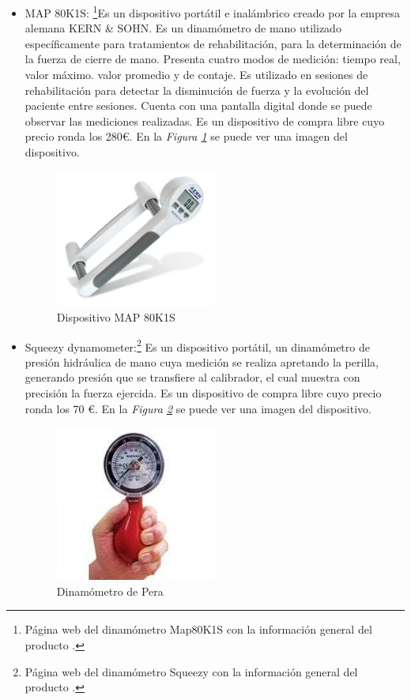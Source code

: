 \begin{itemize}
    \item MAP 80K1S: \cite{Map80k1s}\footnote{Página web del dinamómetro Map80K1S con la información general del producto \cite{Map80k1s}.}Es un dispositivo portátil e inalámbrico creado por la empresa alemana KERN \& SOHN. Es un dinamómetro de mano utilizado específicamente para tratamientos de rehabilitación, para la determinación de la fuerza de cierre de mano.
    Presenta cuatro modos de medición: tiempo real, valor máximo. valor promedio y de contaje. 
    Es utilizado en sesiones de rehabilitación para detectar la disminución de fuerza y la evolución del paciente entre sesiones. Cuenta con una pantalla digital donde se puede observar las mediciones realizadas.
    Es un dispositivo de compra libre cuyo precio ronda los 280€. En la \textit{Figura \ref{fig:Dispositivo MAP 80K1S}} se puede ver una imagen del dispositivo.
      \begin{figure}[h]
        \centering
        \includegraphics[width=0.5\textwidth]{img/MAP-80K1S.jpg}
        \caption{Dispositivo MAP 80K1S}
        \label{fig:Dispositivo MAP 80K1S}
    \end{figure}
    
    \item Squeezy dynamometer:\cite{SqueezeDinamometro}\footnote{Página web del dinamómetro Squeezy con la información general del producto \cite{SqueezeDinamometro}.} Es un dispositivo portátil, un dinamómetro de presión hidráulica de mano cuya medición se realiza apretando la perilla, generando presión que se transfiere al calibrador, el cual muestra con precisión la fuerza ejercida. Es un dispositivo de compra libre cuyo precio ronda los 70 €. En la \textit{Figura \ref{fig:Dinamómetro de Pera}} se puede ver una imagen del dispositivo.
    \begin{figure}[h]
        \centering
        \includegraphics[width=0.5\textwidth]{img/Dinamometro pera.jpeg}
        \caption{Dinamómetro de Pera}
        \label{fig:Dinamómetro de Pera}
    \end{figure}
\end{itemize}
